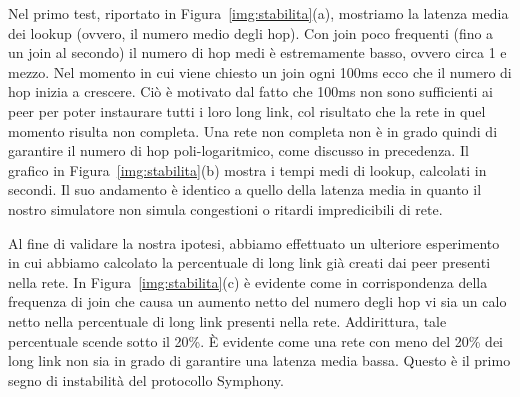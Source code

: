 \documentclass[prodmode,acmtap]{acmlarge}
\begin{document}
Nel primo test, riportato in Figura~\ref{img:stabilita}(a), mostriamo la latenza media dei lookup (ovvero, il numero medio degli hop). Con join poco frequenti (fino a un join al secondo) il numero di hop medi è estremamente basso, ovvero circa 1 e mezzo. Nel momento in cui viene chiesto un join ogni 100ms ecco che il numero di hop inizia a crescere. Ciò è motivato dal fatto che 100ms non sono sufficienti ai peer per poter instaurare tutti i loro long link, col risultato che la rete in quel momento risulta non completa. Una rete non completa non è in grado quindi di garantire il numero di hop poli-logaritmico, come discusso in precedenza. Il grafico in Figura~\ref{img:stabilita}(b) mostra i tempi medi di lookup, calcolati in secondi. Il suo andamento è identico a quello della latenza media in quanto il nostro simulatore non simula congestioni o ritardi impredicibili di rete.

Al fine di validare la nostra ipotesi, abbiamo effettuato un ulteriore esperimento in cui abbiamo calcolato la percentuale di long link già creati dai peer presenti nella rete. In Figura~\ref{img:stabilita}(c) è evidente come in corrispondenza della frequenza di join che causa un aumento netto del numero degli hop vi sia un calo netto nella percentuale di long link presenti nella rete. Addirittura, tale percentuale scende sotto il 20\%. È evidente come una rete con meno del 20\% dei long link non sia in grado di garantire una latenza media bassa. Questo è il primo segno di instabilità del protocollo Symphony.
\end{document}
